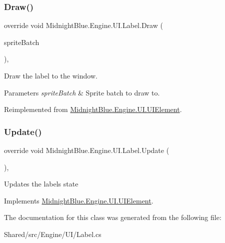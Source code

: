 \subsubsection{\texorpdfstring{Draw()}{Draw()}}
{\footnotesize\ttfamily override void Midnight\+Blue.\+Engine.\+U\+I.\+Label.\+Draw (\begin{DoxyParamCaption}\item[{Sprite\+Batch}]{sprite\+Batch }\end{DoxyParamCaption})\hspace{0.3cm}{\ttfamily [inline]}, {\ttfamily [virtual]}}



Draw the label to the window. 


\begin{DoxyParams}{Parameters}
{\em sprite\+Batch} & Sprite batch to draw to.\\
\hline
\end{DoxyParams}


Reimplemented from \hyperlink{class_midnight_blue_1_1_engine_1_1_u_i_1_1_u_i_element_a0faa27f642478cd428c4718f66263325}{Midnight\+Blue.\+Engine.\+U\+I.\+U\+I\+Element}.

\hypertarget{class_midnight_blue_1_1_engine_1_1_u_i_1_1_label_a781cdf493fe8f9af8433635ea9aa97b5}{}\label{class_midnight_blue_1_1_engine_1_1_u_i_1_1_label_a781cdf493fe8f9af8433635ea9aa97b5} 
\subsubsection{\texorpdfstring{Update()}{Update()}}
{\footnotesize\ttfamily override void Midnight\+Blue.\+Engine.\+U\+I.\+Label.\+Update (\begin{DoxyParamCaption}{ }\end{DoxyParamCaption})\hspace{0.3cm}{\ttfamily [inline]}, {\ttfamily [virtual]}}



Updates the labels state 



Implements \hyperlink{class_midnight_blue_1_1_engine_1_1_u_i_1_1_u_i_element_a5b2bff6eed644fc33bc3e1ffaa8bfc70}{Midnight\+Blue.\+Engine.\+U\+I.\+U\+I\+Element}.



The documentation for this class was generated from the following file\+:\begin{DoxyCompactItemize}
\item 
Shared/src/\+Engine/\+U\+I/Label.\+cs\end{DoxyCompactItemize}
